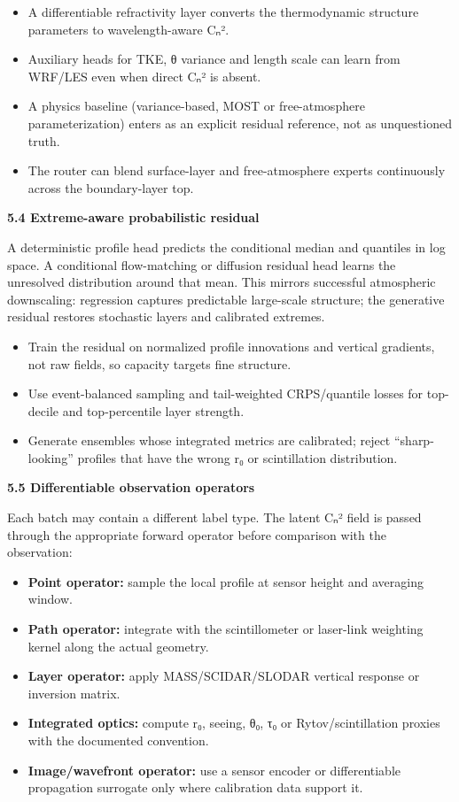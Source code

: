 \documentclass[
]{article}
\begin{document}
\begin{itemize}
\item
  A differentiable refractivity layer converts the thermodynamic
  structure parameters to wavelength-aware Cₙ².
\item
  Auxiliary heads for TKE, θ variance and length scale can learn from
  WRF/LES even when direct Cₙ² is absent.
\item
  A physics baseline (variance-based, MOST or free-atmosphere
  parameterization) enters as an explicit residual reference, not as
  unquestioned truth.
\item
  The router can blend surface-layer and free-atmosphere experts
  continuously across the boundary-layer top.
\end{itemize}

\textbf{5.4 Extreme-aware probabilistic residual}

A deterministic profile head predicts the conditional median and
quantiles in log space. A conditional flow-matching or diffusion
residual head learns the unresolved distribution around that mean. This
mirrors successful atmospheric downscaling: regression captures
predictable large-scale structure; the generative residual restores
stochastic layers and calibrated extremes.

\begin{itemize}
\item
  Train the residual on normalized profile innovations and vertical
  gradients, not raw fields, so capacity targets fine structure.
\item
  Use event-balanced sampling and tail-weighted CRPS/quantile losses for
  top-decile and top-percentile layer strength.
\item
  Generate ensembles whose integrated metrics are calibrated; reject
  ``sharp-looking'' profiles that have the wrong r₀ or scintillation
  distribution.
\end{itemize}

\textbf{5.5 Differentiable observation operators}

Each batch may contain a different label type. The latent Cₙ² field is
passed through the appropriate forward operator before comparison with
the observation:

\begin{itemize}
\item
  \textbf{Point operator:} sample the local profile at sensor height and
  averaging window.
\item
  \textbf{Path operator:} integrate with the scintillometer or
  laser-link weighting kernel along the actual geometry.
\item
  \textbf{Layer operator:} apply MASS/SCIDAR/SLODAR vertical response or
  inversion matrix.
\item
  \textbf{Integrated optics:} compute r₀, seeing, θ₀, τ₀ or
  Rytov/scintillation proxies with the documented convention.
\item
  \textbf{Image/wavefront operator:} use a sensor encoder or
  differentiable propagation surrogate only where calibration data
  support it.
\end{itemize}
\end{document}

